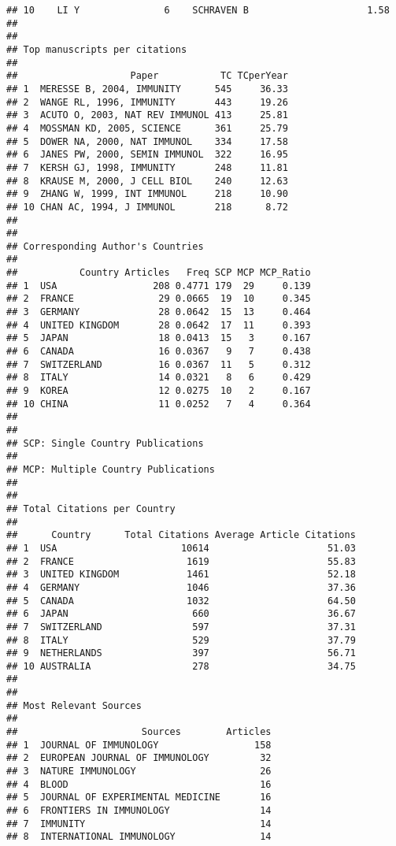 \documentclass[]{article}
\begin{document}
\begin{verbatim}
## 10    LI Y               6    SCHRAVEN B                     1.58
## 
## 
## Top manuscripts per citations
## 
##                    Paper           TC TCperYear
## 1  MERESSE B, 2004, IMMUNITY      545     36.33
## 2  WANGE RL, 1996, IMMUNITY       443     19.26
## 3  ACUTO O, 2003, NAT REV IMMUNOL 413     25.81
## 4  MOSSMAN KD, 2005, SCIENCE      361     25.79
## 5  DOWER NA, 2000, NAT IMMUNOL    334     17.58
## 6  JANES PW, 2000, SEMIN IMMUNOL  322     16.95
## 7  KERSH GJ, 1998, IMMUNITY       248     11.81
## 8  KRAUSE M, 2000, J CELL BIOL    240     12.63
## 9  ZHANG W, 1999, INT IMMUNOL     218     10.90
## 10 CHAN AC, 1994, J IMMUNOL       218      8.72
## 
## 
## Corresponding Author's Countries
## 
##           Country Articles   Freq SCP MCP MCP_Ratio
## 1  USA                 208 0.4771 179  29     0.139
## 2  FRANCE               29 0.0665  19  10     0.345
## 3  GERMANY              28 0.0642  15  13     0.464
## 4  UNITED KINGDOM       28 0.0642  17  11     0.393
## 5  JAPAN                18 0.0413  15   3     0.167
## 6  CANADA               16 0.0367   9   7     0.438
## 7  SWITZERLAND          16 0.0367  11   5     0.312
## 8  ITALY                14 0.0321   8   6     0.429
## 9  KOREA                12 0.0275  10   2     0.167
## 10 CHINA                11 0.0252   7   4     0.364
## 
## 
## SCP: Single Country Publications
## 
## MCP: Multiple Country Publications
## 
## 
## Total Citations per Country
## 
##      Country      Total Citations Average Article Citations
## 1  USA                      10614                     51.03
## 2  FRANCE                    1619                     55.83
## 3  UNITED KINGDOM            1461                     52.18
## 4  GERMANY                   1046                     37.36
## 5  CANADA                    1032                     64.50
## 6  JAPAN                      660                     36.67
## 7  SWITZERLAND                597                     37.31
## 8  ITALY                      529                     37.79
## 9  NETHERLANDS                397                     56.71
## 10 AUSTRALIA                  278                     34.75
## 
## 
## Most Relevant Sources
## 
##                      Sources        Articles
## 1  JOURNAL OF IMMUNOLOGY                 158
## 2  EUROPEAN JOURNAL OF IMMUNOLOGY         32
## 3  NATURE IMMUNOLOGY                      26
## 4  BLOOD                                  16
## 5  JOURNAL OF EXPERIMENTAL MEDICINE       16
## 6  FRONTIERS IN IMMUNOLOGY                14
## 7  IMMUNITY                               14
## 8  INTERNATIONAL IMMUNOLOGY               14

\end{verbatim}
\end{document}
